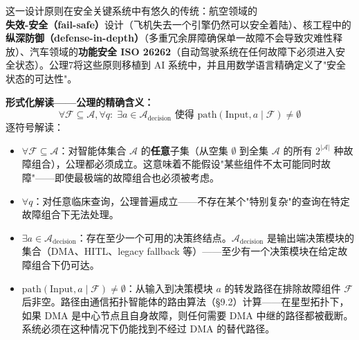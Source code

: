 \documentclass[11pt,a4paper]{ctexart}
\theoremstyle{remark}
\begin{document}
这一设计原则在安全关键系统中有悠久的传统：航空领域的\textbf{失效-安全（fail-safe）}设计（飞机失去一个引擎仍然可以安全着陆）、核工程中的\textbf{纵深防御（defense-in-depth）}（多重冗余屏障确保单一故障不会导致灾难性释放）、汽车领域的\textbf{功能安全 ISO 26262}（自动驾驶系统在任何故障下必须进入安全状态）。公理7将这些原则移植到 AI 系统中，并且用数学语言精确定义了"安全状态的可达性"。

\textbf{形式化解读——公理的精确含义：}
\[
\forall \mathcal{F} \subseteq \mathcal{A}, \forall q:\; \exists a \in \mathcal{A}_{\text{decision}} \text{ 使得 } \text{path}(\text{Input}, a \mid \mathcal{F}) \neq \emptyset
\]
逐符号解读：
\begin{itemize}[nosep]
\item \textbf{$\forall \mathcal{F} \subseteq \mathcal{A}$}：对智能体集合 $\mathcal{A}$ 的\textbf{任意}子集（从空集 $\emptyset$ 到全集 $\mathcal{A}$ 的所有 $2^{|\mathcal{A}|}$ 种故障组合），公理都必须成立。这意味着不能假设"某些组件不太可能同时故障"——即使最极端的故障组合也必须被考虑。
\item \textbf{$\forall q$}：对任意临床查询，公理普遍成立——不存在某个"特别复杂"的查询在特定故障组合下无法处理。
\item \textbf{$\exists a \in \mathcal{A}_{\text{decision}}$}：存在至少一个可用的决策终结点。$\mathcal{A}_{\text{decision}}$ 是输出端决策模块的集合（DMA、HITL、legacy fallback 等）——至少有一个决策模块在给定故障组合下仍可达。
\item \textbf{$\text{path}(\text{Input}, a \mid \mathcal{F}) \neq \emptyset$}：从输入到决策模块 $a$ 的转发路径在排除故障组件 $\mathcal{F}$ 后非空。路径由通信拓扑智能体的路由算法（§9.2）计算——在星型拓扑下，如果 DMA 是中心节点且自身故障，则任何需要 DMA 中继的路径都被截断。系统必须在这种情况下仍能找到不经过 DMA 的替代路径。
\end{itemize}
\end{document}
